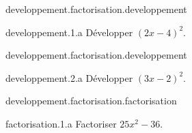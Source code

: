 \begin{qcm}{developpement.factorisation.developpement}
    \begin{question}{developpement.1.a}
         Développer \((2x-4)^2\).
         \vspace{-1.5ex}
         \begin{multicols}{2}
         \begin{reponses}
         \end{reponses}
         \setcounter{unbalance}{1}
         \end{multicols}
    \end{question}
\end{qcm}

\begin{qcm}{developpement.factorisation.developpement}
    \begin{question}{developpement.2.a}
         Développer \((3x-2)^2\).
         \vspace{-1.5ex}
         \begin{multicols}{2}
         \begin{reponses}
         \end{reponses}
         \setcounter{unbalance}{1}
         \end{multicols}
    \end{question}
\end{qcm}




\begin{qcm}{developpement.factorisation.factorisation}
    \begin{question}{factorisation.1.a}
         Factoriser \(25x^2-36\).
         \vspace{-1.5ex}
         \begin{multicols}{2}
         \begin{reponses}
         \end{reponses}
         \end{multicols}
    \end{question}
\end{qcm}


